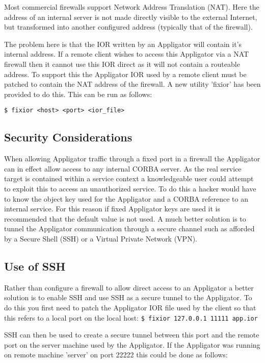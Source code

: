 \documentclass[12pt]{scrbook}
\begin{document}
Most commercial firewalls support Network Address Translation (NAT).
Here the address of an internal server is not made directly visible to
the external Internet, but transformed into another configured address
(typically that of the firewall).

The problem here is that the IOR written by an Appligator will contain
it's internal address. If a remote client wishes to access this
Appligator via a NAT firewall then it cannot use this IOR direct as it
will not contain a routeable address. To support this the Appligator
IOR used by a remote client must be patched to contain the NAT address
of the firewall. A new utility 'fixior' has been provided to do
this. This can be run as follows:

\verb+$ fixior <host> <port> <ior_file>+

\subsection{Security Considerations}

When allowing Appligator traffic through a fixed port in a firewall
the Appligator can in effect allow access to any internal CORBA
server. As the real service target is contained within a service
context a knowledgeable user could attempt to exploit this to access
an unauthorized service. To do this a hacker would have to know the
object key used for the Appligator and a CORBA reference to an
internal service. For this reason if fixed Appligator keys are used it
is recommended that the default value is not used. A much better
solution is to tunnel the Appligator communication through a secure
channel such as afforded by a Secure Shell (SSH) or a Virtual Private
Network (VPN).

\subsection{Use of SSH}

Rather than configure a firewall to allow direct access to an
Appligator a better solution is to enable SSH and use SSH as a secure
tunnel to the Appligator. To do this you first need to patch the
Appligator IOR file used by the client so that this refers to a local
port on the local host: 
\verb+$ fixior 127.0.0.1 11111 app.ior+

SSH can then be used to create a secure tunnel between this port and
the remote port on the server machine used by the Appligator. If the
Appligator was running on remote machine 'server' on port 22222 this
could be done as follows:
\end{document}
